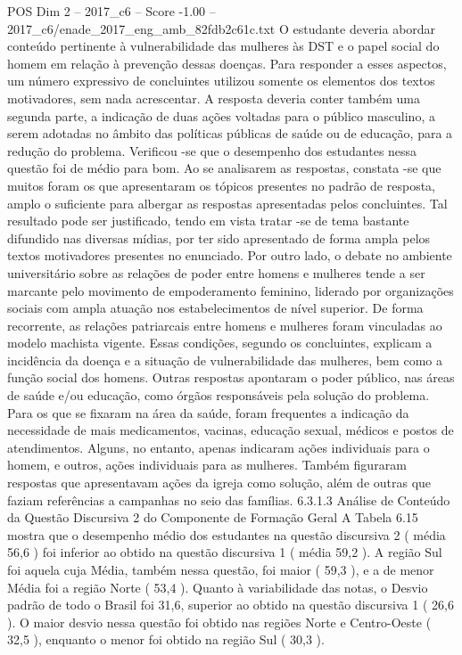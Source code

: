 \begin{textsample}{POS Dim 2 – 2017\_c6 – Score -1.00 – 2017\_c6/enade\_2017\_eng\_amb\_82fdb2c61c.txt}
O estudante deveria abordar conteúdo pertinente à vulnerabilidade das mulheres às DST e o papel social do homem em relação à prevenção dessas doenças.
Para responder a esses aspectos, um número expressivo de concluintes utilizou somente os elementos dos textos motivadores, sem nada acrescentar.
A resposta deveria conter também uma segunda parte, a indicação de duas ações voltadas para o público masculino, a serem adotadas no âmbito das políticas públicas de saúde ou de educação, para a redução do problema.
Verificou -se que o desempenho dos estudantes nessa questão foi de médio para bom.
Ao se analisarem as respostas, constata -se que muitos foram os que apresentaram os tópicos presentes no padrão de resposta, amplo o suficiente para albergar as respostas apresentadas pelos concluintes.
Tal resultado pode ser justificado, tendo em vista tratar -se de tema bastante difundido nas diversas mídias, por ter sido apresentado de forma ampla pelos textos motivadores presentes no enunciado.
Por outro lado, o debate no ambiente universitário sobre as relações de poder entre homens e mulheres tende a ser marcante pelo movimento de empoderamento feminino, liderado por organizações sociais com ampla atuação nos estabelecimentos de nível superior.
De forma recorrente, as relações patriarcais entre homens e mulheres foram vinculadas ao modelo machista vigente.
Essas condições, segundo os concluintes, explicam a incidência da doença e a situação de vulnerabilidade das mulheres, bem como a função social dos homens.
Outras respostas apontaram o poder público, nas áreas de saúde e/ou educação, como órgãos responsáveis pela solução do problema.
Para os que se fixaram na área da saúde, foram frequentes a indicação da necessidade de mais medicamentos, vacinas, educação sexual, médicos e postos de atendimentos.
Alguns, no entanto, apenas indicaram ações individuais para o homem, e outros, ações individuais para as mulheres.
Também figuraram respostas que apresentavam ações da igreja como solução, além de outras que faziam referências a campanhas no seio das famílias. 6.3.1.3 Análise de Conteúdo da Questão Discursiva 2 do Componente de Formação Geral A Tabela 6.15 mostra que o desempenho médio dos estudantes na questão discursiva 2 ( média 56,6 ) foi inferior ao obtido na questão discursiva 1 ( média 59,2 ).
A região Sul foi aquela cuja Média, também nessa questão, foi maior ( 59,3 ), e a de menor Média foi a região Norte ( 53,4 ).
Quanto à variabilidade das notas, o Desvio padrão de todo o Brasil foi 31,6, superior ao obtido na questão discursiva 1 ( 26,6 ).
O maior desvio nessa questão foi obtido nas regiões Norte e Centro-Oeste ( 32,5 ), enquanto o menor foi obtido na região Sul ( 30,3 ).

\end{textsample}
